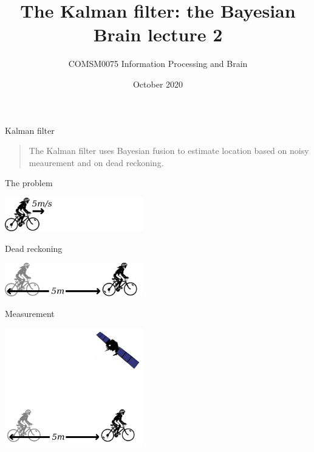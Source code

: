 \documentclass{beamer}
\title[The Bayesian Brain lecture 3]{The Kalman filter: the Bayesian Brain lecture 2}
\author{COMSM0075 Information Processing and Brain}
\institute{\texttt{comsm0075.github.io}}
\date{October 2020}
\begin{document}
\maketitle



\begin{frame}{Kalman filter}
  \begin{quote}
The Kalman filter uses Bayesian fusion to estimate location based on noisy meaurement and on dead reckoning.
  \end{quote}

\end{frame}

\begin{frame}{The problem}
\begin{center}
\includegraphics[width=6cm]{cyclist1.png}
\end{center}
\end{frame}


\begin{frame}{Dead reckoning}
\begin{center}
\includegraphics[width=6cm]{cyclist2.png}
\end{center}
\end{frame}


\begin{frame}{Measurement}
\begin{center}
\includegraphics[width=6cm]{cyclist_gps.png}
\end{center}
\end{frame}
\end{document}
